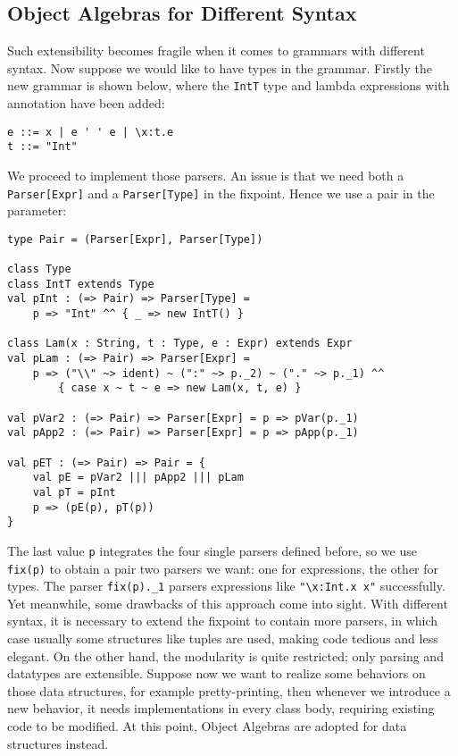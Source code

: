 \subsection{Object Algebras for Different Syntax}\label{subsec:differentsyntax}

Such extensibility becomes fragile when it comes to grammars with different syntax. Now suppose we would like to have types in the grammar. Firstly the new grammar is shown below, where the \lstinline{IntT} type and lambda expressions with annotation have been added:
\begin{lstlisting}
e ::= x | e ' ' e | \x:t.e
t ::= "Int"
\end{lstlisting}

We proceed to implement those parsers. An issue is that we need both a \lstinline{Parser[Expr]} and a \lstinline{Parser[Type]} in the fixpoint.
Hence we use a pair in the parameter:
\begin{lstlisting}
type Pair = (Parser[Expr], Parser[Type])

class Type
class IntT extends Type
val pInt : (=> Pair) => Parser[Type] =
    p => "Int" ^^ { _ => new IntT() }

class Lam(x : String, t : Type, e : Expr) extends Expr
val pLam : (=> Pair) => Parser[Expr] =
    p => ("\\" ~> ident) ~ (":" ~> p._2) ~ ("." ~> p._1) ^^
        { case x ~ t ~ e => new Lam(x, t, e) }

val pVar2 : (=> Pair) => Parser[Expr] = p => pVar(p._1)
val pApp2 : (=> Pair) => Parser[Expr] = p => pApp(p._1)

val pET : (=> Pair) => Pair = {
    val pE = pVar2 ||| pApp2 ||| pLam
    val pT = pInt
    p => (pE(p), pT(p))
}
\end{lstlisting}
The last value \lstinline{p} integrates the four single parsers defined before, so we use \lstinline{fix(p)} to
obtain a pair two parsers we want: one for expressions, the other for types. The parser \lstinline{fix(p)._1} parsers expressions
like \lstinline{"\x:Int.x x"} successfully. Yet meanwhile, some drawbacks of this approach come into sight. With different syntax, it
is necessary to extend the fixpoint to contain more parsers, in which case usually some structures like tuples are used,
making code tedious and less elegant. On the other hand, the modularity is quite restricted; only parsing and datatypes are extensible.
Suppose now we want to realize some behaviors on those data structures, for example pretty-printing, then whenever we introduce a new behavior,
it needs implementations in every class body, requiring existing code to be modified. At this point, Object Algebras are adopted for data structures
instead.

